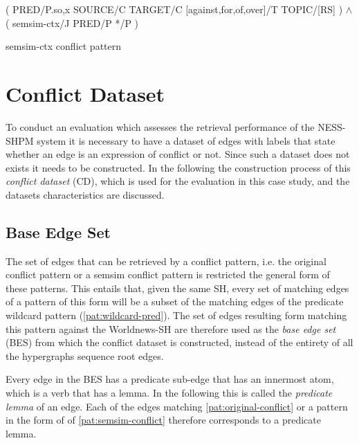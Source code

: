 \documentclass[11pt]{scrreprt}
\begin{document}
\begin{pattern}[H]
  \normalfont\sffamily
  \centering
  ( PRED/P.{so,x} SOURCE/C TARGET/C [against,for,of,over]/T TOPIC/[RS] ) \(\wedge\)\\ 
  ( semsim-ctx/J PRED/P */P )
  \caption{semsim-ctx conflict pattern}
  \label{pat:semsim-ctx-conflict}
\end{pattern}



\section{Conflict Dataset}
\label{sec:conflict-dataset}
To conduct an evaluation which assesses the retrieval performance of the NESS-SHPM system it is necessary to have a dataset of edges with labels that state whether an edge is an expression of conflict or not. Since such a dataset does not exists it needs to be constructed. In the following the construction process of this \textit{conflict dataset} (CD), which is used for the evaluation in this case study, and the datasets characteristics are discussed.


\subsection{Base Edge Set}
The set of edges that can be retrieved by a conflict pattern, i.e. the original conflict pattern or a semsim conflict pattern is restricted the general form of these patterns. This entails that, given the same SH, every set of matching edges of a pattern of this form will be a subset of the matching edges of the predicate wildcard pattern (\cref{pat:wildcard-pred}). The set of edges resulting form matching this pattern against the Worldnews-SH are therefore used as the \textit{base edge set} (BES) from which the conflict dataset is constructed, instead of the entirety of all the hypergraphs sequence root edges.

Every edge in the BES has a predicate sub-edge that has an innermost atom, which is a verb that has a lemma. In the following this is called the \textit{predicate lemma} of an edge. Each of the edges matching \cref{pat:original-conflict} or a pattern in the form of of \cref{pat:semsim-conflict} therefore corresponds to a predicate lemma.

\end{document}
